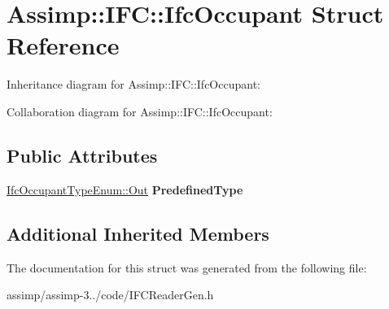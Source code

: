 \hypertarget{struct_assimp_1_1_i_f_c_1_1_ifc_occupant}{\section{Assimp\+:\+:I\+F\+C\+:\+:Ifc\+Occupant Struct Reference}
\label{struct_assimp_1_1_i_f_c_1_1_ifc_occupant}
}


Inheritance diagram for Assimp\+:\+:I\+F\+C\+:\+:Ifc\+Occupant\+:


Collaboration diagram for Assimp\+:\+:I\+F\+C\+:\+:Ifc\+Occupant\+:
\subsection*{Public Attributes}
\begin{DoxyCompactItemize}
\item 
\hypertarget{struct_assimp_1_1_i_f_c_1_1_ifc_occupant_ab24a253db7a783777efc5393112acda7}{\hyperlink{classboost_1_1shared__ptr}{Ifc\+Occupant\+Type\+Enum\+::\+Out} {\bfseries Predefined\+Type}}\label{struct_assimp_1_1_i_f_c_1_1_ifc_occupant_ab24a253db7a783777efc5393112acda7}

\end{DoxyCompactItemize}
\subsection*{Additional Inherited Members}


The documentation for this struct was generated from the following file\+:\begin{DoxyCompactItemize}
\item 
assimp/assimp-\/3../code/I\+F\+C\+Reader\+Gen.\+h\end{DoxyCompactItemize}
